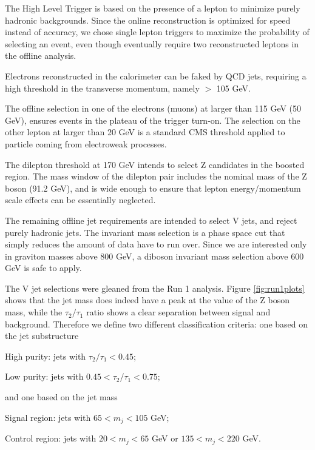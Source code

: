 \begin{compact_itemize}
\item The High Level Trigger is based on the presence of a lepton to minimize purely hadronic backgrounds. Since the online reconstruction is optimized for speed instead of accuracy, we chose single lepton triggers to maximize the probability of selecting an event, even though eventually require two reconstructed leptons in the offline analysis.
	
\item Electrons reconstructed in the calorimeter can be faked by QCD jets, requiring a high threshold in the transverse momentum, namely \ptrans $>$ 105 GeV.
	

\item The offline selection in one of the electrons (muons) at \ptrans larger than 115 GeV (50 GeV), ensures events in the plateau of the trigger turn-on. The selection on the other lepton at \ptrans larger than 20 GeV is a standard CMS threshold applied to particle coming from electroweak processes.

\item The dilepton \ptrans threshold at 170 GeV intends to select Z candidates in the boosted region. The mass window of the dilepton pair includes the nominal mass of the Z boson (91.2 GeV), and is wide enough to ensure that lepton energy/momentum scale effects can be essentially neglected.

\item The remaining offline jet requirements are intended to select V jets, and reject purely hadronic jets. The invariant mass selection is a phase space cut that simply reduces the amount of data have to run over. Since we are interested only in graviton masses above 800 GeV, a diboson invariant mass selection above 600 GeV is safe to apply.
\end{compact_itemize}

The V jet selections were gleaned from the Run 1 analysis. Figure \ref{fig:run1plots} shows that the jet mass does indeed have a peak at the value of the Z boson mass, while the $\tau_2/\tau_1$ ratio shows a clear separation between signal and background. Therefore we define two different classification criteria: one based on the jet substructure
\begin{compact_itemize}
\item High purity: jets with $ \tau_2/\tau_1 < 0.45$;
\item Low purity: jets with $ 0.45 < \tau_2/\tau_1 < 0.75$;
\end{compact_itemize}
and one based on the jet mass
\begin{compact_itemize}
\item Signal region: jets with $ 65 < m_j < 105 $ GeV;
\item Control region: jets with $ 20 < m_j < 65 $ GeV or $ 135 < m_j < 220 $ GeV. 
\end{compact_itemize}

